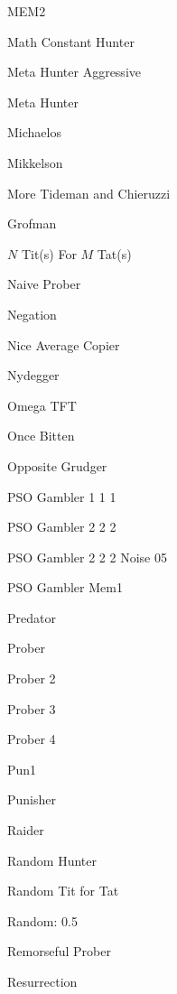 \item MEM2~\cite{Li20142}
\item Math Constant Hunter~\cite{axelrodproject}
\item Meta Hunter Aggressive~\cite{axelrodproject}
\item Meta Hunter~\cite{axelrodproject}
\item Michaelos~\cite{LessWrong2011}
\item Mikkelson~\cite{Axelrod1980b}
\item More Tideman and Chieruzzi~\cite{Axelrod1980b}
\item Grofman~\cite{Axelrod1980b}
\item \(N\) Tit(s) For \(M\) Tat(s)~\cite{axelrodproject}
\item Naive Prober~\cite{Li2011}
\item Negation~\cite{PD2017}
\item Nice Average Copier~\cite{axelrodproject}
\item Nydegger~\cite{Axelrod1980a}
\item Omega TFT~\cite{kendall2007iterated}
\item Once Bitten~\cite{axelrodproject}
\item Opposite Grudger~\cite{axelrodproject}
\item PSO Gambler 1 1 1~\cite{axelrodproject}
\item PSO Gambler 2 2 2~\cite{axelrodproject}
\item PSO Gambler 2 2 2 Noise 05~\cite{axelrodproject}
\item PSO Gambler Mem1 \cite{axelrodproject}
\item Predator~\cite{Ashlock2006}
\item Prober~\cite{Li2011}
\item Prober 2~\cite{prison}
\item Prober 3~\cite{prison}
\item Prober 4~\cite{prison}
\item Pun1~\cite{Ashlock2006}
\item Punisher~\cite{axelrodproject}
\item Raider~\cite{Ashlock2014}
\item Random Hunter~\cite{axelrodproject}
\item Random Tit for Tat~\cite{axelrodproject}
\item Random: 0.5~\cite{Axelrod1980a, Tzafestas2000}
\item Remorseful Prober~\cite{Li2011}
\item Resurrection~\cite{Eckhart2015}

